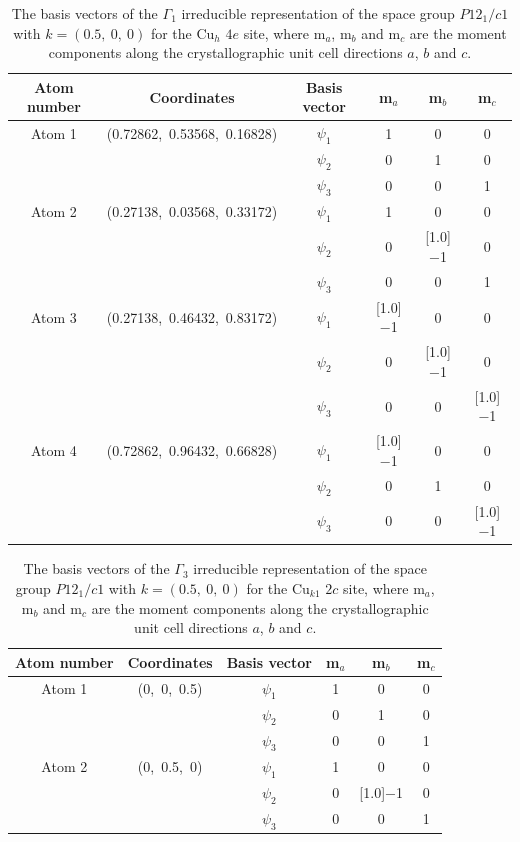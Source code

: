 \documentclass[
sn-mathphys,
Numbered,
onecolumn]
{sn-jnl}%
\newcommand{\minus}{\scalebox{0.75}[1.0]{$-$}}
\begin{document}
\begin{table}[ht!]
    \centering
    \begin{tabular}{c c c c c c} \hline \hline
      Atom number & Coordinates & {Basis vector} & {m$_a$} & m$_b$ &{m$_c$} \\ \hline
       Atom 1 & (0.72862,~0.53568,~0.16828) & $\psi_1$ & 1 & 0 & 0 \\ 
      & & $\psi_2$ & 0 & 1 &  0  \\
     & & $\psi_3$ & 0 & 0 & 1  \\
     Atom 2 & (0.27138,~0.03568,~0.33172) & $\psi_1$ & 1 & 0 & 0 \\
    & & $\psi_2$ & 0 & \minus 1 &  0  \\
     & & $\psi_3$ & 0 & 0 & 1  \\ 
     Atom 3 & (0.27138,~0.46432,~0.83172) & $\psi_1$ & \minus 1 & 0 & 0 \\
    & & $\psi_2$ & 0 & \minus 1 &  0  \\
     & & $\psi_3$ & 0 & 0 & \minus 1  \\ 
     Atom 4 & (0.72862,~0.96432,~0.66828) & $\psi_1$ & \minus 1 & 0 & 0 \\
    & & $\psi_2$ & 0 &  1 &  0  \\
     & & $\psi_3$ & 0 & 0 & \minus 1 \\ 
       \hline \hline
   
\end{tabular}
    \caption{The basis vectors of the $\Gamma_1$ irreducible representation of the space group $P12_1/c1$ with ${k}=(0.5,~0,~0)$ for the Cu$_{h}$ $4e$ site, where m$_a$, m$_b$ and m$_c$ are the moment components along the crystallographic unit cell directions $a$, $b$ and $c$.}
    \label{avv_cuh_BVs_gamma1}
\end{table}

\begin{table}[ht!]
    \centering
    \begin{tabular}{c c c c c c} \hline \hline
      Atom number & Coordinates & {Basis vector} & {m$_a$} & m$_b$ &{m$_c$} \\ \hline
       Atom 1 & (0,~0,~0.5) & $\psi_1$ & 1 & 0 & 0 \\ 
      & & $\psi_2$ & 0 & 1 &  0  \\
     & & $\psi_3$ & 0 & 0 & 1  \\
     Atom 2 & (0,~0.5,~0) & $\psi_1$ &  1 & 0 & 0 \\
    & & $\psi_2$ & 0 &  \minus 1 &  0  \\
     & & $\psi_3$ & 0 & 0 & 1  \\ 
       \hline \hline
   
\end{tabular}
    \caption{The basis vectors of the $\Gamma_3$ irreducible representation of the space group $P12_1/c1$ with ${k}=(0.5,~0,~0)$ for the Cu$_{k1}$ $2c$ site, where m$_a$, m$_b$ and m$_c$ are the moment components along the crystallographic unit cell directions $a$, $b$ and $c$.}
    \label{avv_cuk1_BVs_gamma3}
\end{table}
\end{document}
